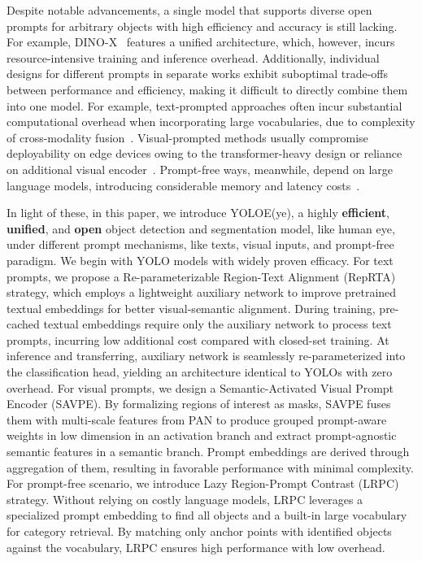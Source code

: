 \documentclass[10pt,twocolumn,letterpaper]{article}
\begin{document}
Despite notable advancements, a single model that supports diverse open prompts for arbitrary objects with high efficiency and accuracy is still lacking. For example, DINO-X~\cite{ren2024dinox} features a unified architecture, which, however, incurs resource-intensive training and inference overhead. Additionally, individual designs for different prompts in separate works exhibit suboptimal trade-offs between performance and efficiency, making it difficult to directly combine them into one model. For example, text-prompted approaches often incur substantial computational overhead when incorporating large vocabularies, due to complexity of cross-modality fusion~\cite{cheng2024yoloworld,liu2024gdino,li2022glip,ren2024dinox}. Visual-prompted methods usually compromise deployability on edge devices owing to the transformer-heavy design or reliance on additional visual encoder~\cite{jiang2024trex2,li2024dinov,zang2022ovdetr}. Prompt-free ways, meanwhile, depend on large language models, introducing considerable memory and latency costs~\cite{lin2024generateu,ren2024dinox}.

In light of these, in this paper, we introduce YOLOE(ye), a highly \textbf{efficient}, \textbf{unified}, and \textbf{open} object detection and segmentation model, like human eye, under different prompt mechanisms, like texts, visual inputs, and prompt-free paradigm. We begin with YOLO models with widely proven efficacy. For text prompts, we propose a Re-parameterizable Region-Text Alignment (RepRTA) strategy, which employs a lightweight auxiliary network to improve pretrained textual embeddings for better visual-semantic alignment. During training, pre-cached textual embeddings require only the auxiliary network to process text prompts, incurring low additional cost compared with closed-set training. At inference and transferring, auxiliary network is seamlessly re-parameterized into the classification head, yielding an architecture identical to YOLOs with zero overhead. For visual prompts, we design a Semantic-Activated Visual Prompt Encoder (SAVPE). By formalizing regions of interest as masks, SAVPE fuses them with multi-scale features from PAN to produce grouped prompt-aware weights in low dimension in an activation branch and extract prompt-agnostic semantic features in a semantic branch. Prompt embeddings are derived through aggregation of them, resulting in favorable performance with minimal complexity. For prompt-free scenario, we introduce Lazy Region-Prompt Contrast (LRPC) strategy. Without relying on costly language models, LRPC leverages a specialized prompt embedding to find all objects and a built-in large vocabulary for category retrieval. By matching only anchor points with identified objects against the vocabulary, LRPC ensures high performance with low overhead.
\end{document}
